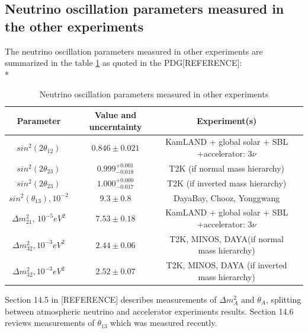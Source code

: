 \subsection{Neutrino oscillation parameters measured in the other experiments}
The neutrino oscillation parameters measured in other experiments are summarized in the table \ref{tab:MeasuredPars} as quoted in the PDG[REFERENCE]:\\*
\begin{table}[h]
  \begin{center}
  \caption{ Neutrino oscillation parameters measured in other experiments}
  \begin{tabular}{|c|c|c|c|}
     Parameter & Value and uncerntainty & Experiment(s) \\ \hline
     $sin^2(2\theta_{12})$ &  $0.846\pm0.021$  &  KamLAND + global solar + SBL +accelerator: 3$\nu$  \\ \hline 
     $sin^2(2\theta_{23})$ &  $0.999^{+0.001}_{-0.018}$  &  T2K (if normal mass hierarchy)   \\ \hline 
     $sin^2(2\theta_{23})$ &  $1.000^{+0.000}_{-0.017}$  &  T2K (if inverted mass hierarchy)   \\ \hline 
     $sin^2(\theta_{13}), 10^{-2}$ &  $9.3\pm0.8$  &  DayaBay, Chooz, Yonggwang    \\ \hline 
     ${\Delta}m^2_{21}$, $10^{-5} eV^2$ &  $7.53\pm0.18$  &  KamLAND + global solar + SBL +accelerator: 3$\nu$   \\ \hline 
     ${\Delta}m^2_{32}, 10^{-3} eV^2$ &  $2.44\pm0.06$  &  T2K, MINOS, DAYA(if normal mass hierarchy)     \\ \hline
     ${\Delta}m^2_{32}, 10^{-3} eV^2$ &  $2.52\pm0.07$  &  T2K, MINOS, DAYA (if inverted mass hierarchy)     \\ \hline 
  \end{tabular}
  \label{tab:MeasuredPars}
  \end{center}
\end{table}

Section 14.5 in [REFERENCE] describes measurements of $\Delta{m^2_A}$ and $\theta_A$, splitting between atmospheric neutrino and accelerator experiments results. Section 14.6 reviews measurements of $\theta_{13}$ which was measured recently.
